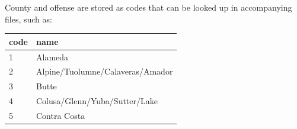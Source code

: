 \documentclass[]{article}
\begin{document}
County and offense are stored as codes that can be looked up in
accompanying files, such as:

\begin{center}
  \begin{minipage}[t]{0.49\textwidth}
\begin{longtable}[]{@{}ll@{}}
  \toprule
  \begin{minipage}[b]{0.08\columnwidth}\raggedright\strut
  code\strut
\end{minipage} &   \begin{minipage}[b]{0.8\columnwidth}\raggedright\strut
  name\strut
\end{minipage}\tabularnewline
\midrule
\endhead
  \begin{minipage}[t]{0.08\columnwidth}\raggedright\strut
  1\strut
\end{minipage} &   \begin{minipage}[t]{0.8\columnwidth}\raggedright\strut
  Alameda                         \strut
\end{minipage}\tabularnewline
  \begin{minipage}[t]{0.08\columnwidth}\raggedright\strut
  2\strut
\end{minipage} &   \begin{minipage}[t]{0.8\columnwidth}\raggedright\strut
  Alpine/Tuolumne/Calaveras/Amador\strut
\end{minipage}\tabularnewline
  \begin{minipage}[t]{0.08\columnwidth}\raggedright\strut
  3\strut
\end{minipage} &   \begin{minipage}[t]{0.8\columnwidth}\raggedright\strut
  Butte                           \strut
\end{minipage}\tabularnewline
  \begin{minipage}[t]{0.08\columnwidth}\raggedright\strut
  4\strut
\end{minipage} &   \begin{minipage}[t]{0.8\columnwidth}\raggedright\strut
  Colusa/Glenn/Yuba/Sutter/Lake   \strut
\end{minipage}\tabularnewline
  \begin{minipage}[t]{0.08\columnwidth}\raggedright\strut
  5\strut
\end{minipage} &   \begin{minipage}[t]{0.8\columnwidth}\raggedright\strut
  Contra Costa                    \strut
\end{minipage}\tabularnewline
  \bottomrule
\end{longtable}

\end{minipage}
\end{center}
\end{document}
